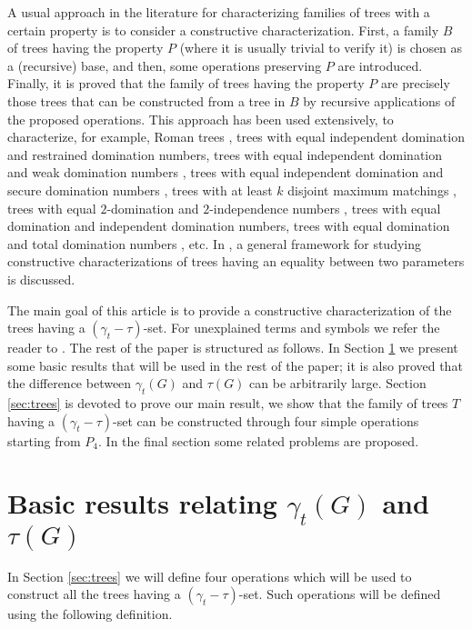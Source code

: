 \documentclass[12pt]{article}%
\theoremstyle{definition}
\newcommand{\gtt}{$(\gamma_t - \tau)$}
\begin{document}
A usual approach in the literature for characterizing
families of trees with a certain property is to consider a
constructive characterization.   First, a family $B$ of
trees having the property $P$ (where it is usually trivial to
verify it) is chosen as a (recursive) base, and then, some
operations preserving $P$ are introduced.   Finally, it is
proved that the family of trees having the property $P$ are
precisely those trees that can be constructed from a tree
in $B$ by recursive applications of the proposed operations.
This approach has been used extensively, to characterize,
for example, Roman trees \cite{henningDMGT22}, trees with
equal independent domination and restrained domination
numbers, trees with equal independent domination and
weak domination numbers \cite{hattinghJGT34}, trees with
equal independent domination and secure domination
numbers \cite{liIPL119}, trees with at least $k$ disjoint
maximum matchings \cite{slaterJCTB25}, trees with equal
$2$-domination and $2$-independence numbers
\cite{brauseDMTCS19}, trees with equal domination and
independent domination numbers, trees with equal
domination and total domination numbers
\cite{dorflingDM306}, etc.   In \cite{dorflingDM306}, a general
framework for studying constructive characterizations of
trees having an equality between two parameters is
discussed.

The main goal of this article is to provide a constructive
characterization of the trees having a \gtt-set.   For
unexplained terms and symbols we refer the reader to
\cite{haynes1998}. The rest of the paper is structured as
follows. In Section \ref{sec:dif} we present some basic
results that will be used in the rest of the paper; it is also
proved that the difference between $\gamma_t (G)$ and
$\tau (G)$ can be arbitrarily large.   Section \ref{sec:trees}
is devoted to prove our main result, we show that the family
of trees $T$ having a \gtt-set can be constructed through
four simple operations starting from $P_4$.   In the final
section some related problems are proposed.


\section{Basic results relating $\gamma_{t}(G)$ and
$\tau (G)$} \label{sec:dif}

In Section \ref{sec:trees} we will define four operations which
will be used to construct all the trees having a \gtt-set.   Such
operations will be defined using the following definition.
\end{document}
